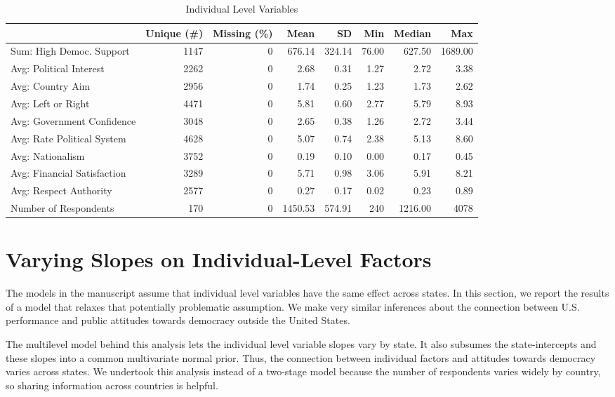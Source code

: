 \documentclass[12pt]{article}
\begin{document}
\begin{table}
\caption{\label{tab:wvs-vars}Individual Level Variables}
\centering
\begin{tabular}[t]{lrrrrrrr}
\toprule
  & Unique (\#) & Missing (\%) & Mean & SD & Min & Median & Max\\
\midrule
Sum: High Democ. Support & 1147 & 0 & 676.14 & 324.14 & 76.00 & 627.50 & 1689.00\\
Avg: Political Interest & 2262 & 0 & 2.68 & 0.31 & 1.27 & 2.72 & 3.38\\
Avg: Country Aim & 2956 & 0 & 1.74 & 0.25 & 1.23 & 1.73 & 2.62\\
Avg: Left or Right & 4471 & 0 & 5.81 & 0.60 & 2.77 & 5.79 & 8.93\\
Avg: Government Confidence & 3048 & 0 & 2.65 & 0.38 & 1.26 & 2.72 & 3.44\\
Avg: Rate Political System & 4628 & 0 & 5.07 & 0.74 & 2.38 & 5.13 & 8.60\\
Avg: Nationalism & 3752 & 0 & 0.19 & 0.10 & 0.00 & 0.17 & 0.45\\
Avg: Financial Satisfaction & 3289 & 0 & 5.71 & 0.98 & 3.06 & 5.91 & 8.21\\
Avg: Respect Authority & 2577 & 0 & 0.27 & 0.17 & 0.02 & 0.23 & 0.89\\
Number of Respondents & 170 & 0 & 1450.53 & 574.91 & 240 & 1216.00 & 4078\\
\bottomrule
\end{tabular}
\end{table}



\section{Varying Slopes on Individual-Level Factors}

The models in the manuscript assume that individual level variables have the same effect across states. 
In this section, we report the results of a model that relaxes that potentially problematic assumption. 
We make very similar inferences about the connection between U.S. performance and public attitudes towards democracy outside the United States.


The multilevel model behind this analysis lets the individual level variable slopes vary by state.
It also subsumes the state-intercepts and these slopes into a common multivariate normal prior. 
Thus, the connection between individual factors and attitudes towards democracy varies across states. 
We undertook this analysis instead of a two-stage model because the number of respondents varies widely by country, so sharing information across countries is helpful.   
\end{document}
